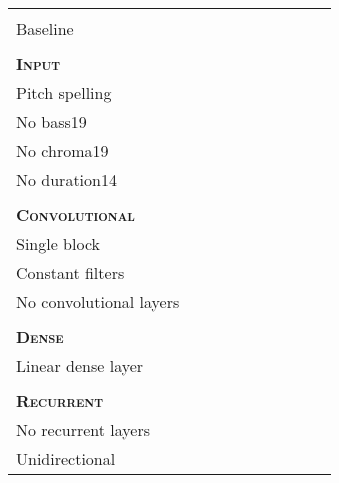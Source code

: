\begin{tabular}{l|rrrrrrrrr}
                                & & & & & & & & & \\
\hline                          & & & & & & & & & \\
Baseline                        & & & & & & & & & \\
\hline                          & & & & & & & & & \\
\textsc{\textbf{Input}}         & & & & & & & & & \\
Pitch spelling                  & & & & & & & & & \\
No \gls{bass19}                 & & & & & & & & & \\
No \gls{chroma19}               & & & & & & & & & \\
No \gls{duration14}             & & & & & & & & & \\
\hline                          & & & & & & & & & \\
\textsc{\textbf{Convolutional}} & & & & & & & & & \\
Single block                    & & & & & & & & & \\
Constant filters                & & & & & & & & & \\
No convolutional layers         & & & & & & & & & \\
\hline                          & & & & & & & & & \\
\textsc{\textbf{Dense}}         & & & & & & & & & \\
Linear dense layer              & & & & & & & & & \\
\hline                          & & & & & & & & & \\
\textsc{\textbf{Recurrent}}     & & & & & & & & & \\
No recurrent layers             & & & & & & & & & \\
Unidirectional                  & & & & & & & & & \\
\end{tabular}
